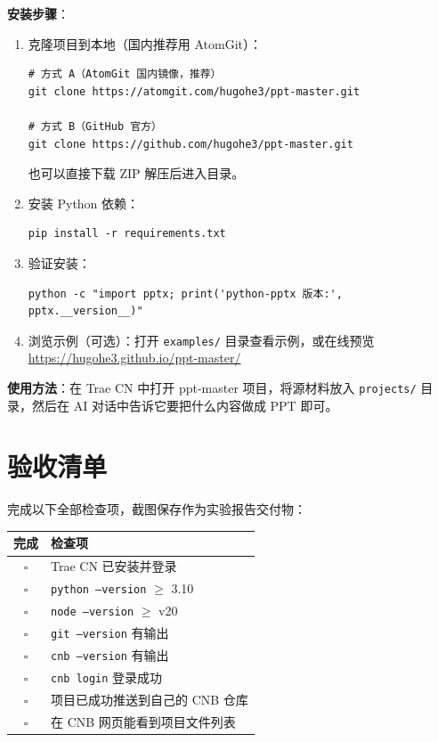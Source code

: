 \textbf{安装步骤}：

\begin{enumerate}[leftmargin=2em]
  \item 克隆项目到本地（国内推荐用 AtomGit）：
  \begin{lstlisting}[style=shell]
# 方式 A（AtomGit 国内镜像，推荐）
git clone https://atomgit.com/hugohe3/ppt-master.git

# 方式 B（GitHub 官方）
git clone https://github.com/hugohe3/ppt-master.git
\end{lstlisting}
  也可以直接下载 ZIP 解压后进入目录。
  \item 安装 Python 依赖：
  \begin{lstlisting}[style=shell]
pip install -r requirements.txt
\end{lstlisting}
  \item 验证安装：
  \begin{lstlisting}[style=shell]
python -c "import pptx; print('python-pptx 版本:', pptx.__version__)"
\end{lstlisting}
  \item 浏览示例（可选）：打开 \texttt{examples/} 目录查看示例，或在线预览 \url{https://hugohe3.github.io/ppt-master/}
\end{enumerate}

\textbf{使用方法}：在 Trae CN 中打开 ppt-master 项目，将源材料放入 \texttt{projects/} 目录，然后在 AI 对话中告诉它要把什么内容做成 PPT 即可。

\section{验收清单}

完成以下全部检查项，截图保存作为实验报告交付物：

\begin{table}[H]
\centering
\begin{tabular}{cl}
\toprule
\textbf{完成} & \textbf{检查项} \\
\midrule
$\square$ & Trae CN 已安装并登录 \\
$\square$ & \texttt{python --version} $\geq$ 3.10 \\
$\square$ & \texttt{node --version} $\geq$ v20 \\
$\square$ & \texttt{git --version} 有输出 \\
$\square$ & \texttt{cnb --version} 有输出 \\
$\square$ & \texttt{cnb login} 登录成功 \\
$\square$ & 项目已成功推送到自己的 CNB 仓库 \\
$\square$ & 在 CNB 网页能看到项目文件列表 \\
\bottomrule
\end{tabular}
\end{table}


